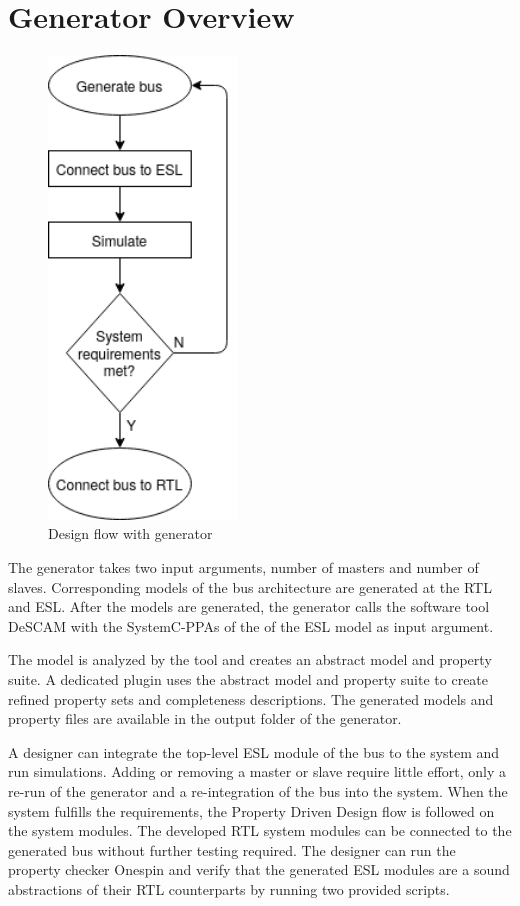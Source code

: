 \section{Generator Overview}
\begin{figure}
\includegraphics[width=5cm]{figs/Generator.png}
\caption{Design flow with generator}\label{fig:dflow}
\end{figure}  

The generator takes two input arguments, number of masters and number of slaves. Corresponding models of the bus architecture are generated at the RTL and ESL.
After the models are generated, the generator calls the software tool DeSCAM with the SystemC-PPAs of the of the ESL model as input argument. \par The model is analyzed by the tool and creates an abstract model and property suite. A dedicated plugin uses the abstract model and property suite to create refined property sets and completeness descriptions. The generated models and property files are available in the output folder of the generator. \par A designer can integrate the top-level ESL module of the bus to the system and run simulations. Adding or removing a master or slave require little effort, only a re-run of the generator and a re-integration of the bus into the system. When the system fulfills the requirements, the Property Driven Design flow is followed on the system modules. The developed RTL system modules can be connected to the generated bus without further testing required. The designer can run the property checker Onespin and verify that the generated ESL modules are a sound abstractions of their RTL counterparts by running two provided scripts. \par

